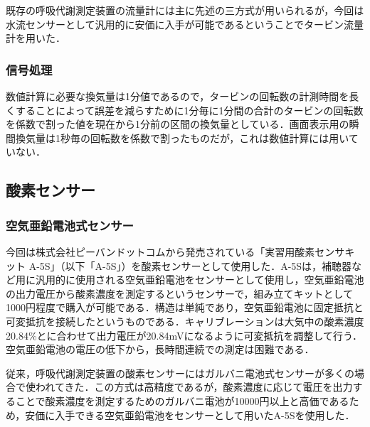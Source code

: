 

既存の呼吸代謝測定装置の流量計には主に先述の三方式が用いられるが，今回は水流センサーとして汎用的に安価に入手が可能であるということでタービン流量計を用いた．

\subsubsection{信号処理}

数値計算に必要な換気量は1分値であるので，タービンの回転数の計測時間を長くすることによって誤差を減らすために1分毎に1分間の合計のタービンの回転数を係数で割った値を現在から1分前の区間の換気量としている．画面表示用の瞬間換気量は1秒毎の回転数を係数で割ったものだが，これは数値計算には用いていない．

\subsection{酸素センサー}

\subsubsection{空気亜鉛電池式センサー}

今回は株式会社ピーバンドットコムから発売されている「実習用酸素センサキット A-5S」（以下「A-5S」）を酸素センサーとして使用した．A-5Sは，補聴器など用に汎用的に使用される空気亜鉛電池をセンサーとして使用し，空気亜鉛電池の出力電圧から酸素濃度を測定するというセンサーで，組み立てキットとして1000円程度で購入が可能である．構造は単純であり，空気亜鉛電池に固定抵抗と可変抵抗を接続したというものである．キャリブレーションは大気中の酸素濃度20.84\%とに合わせて出力電圧が20.84mVになるように可変抵抗を調整して行う．空気亜鉛電池の電圧の低下から，長時間連続での測定は困難である．

従来，呼吸代謝測定装置の酸素センサーにはガルバニ電池式センサーが多くの場合で使われてきた．この方式は高精度であるが，酸素濃度に応じて電圧を出力することで酸素濃度を測定するためのガルバニ電池が10000円以上と高価であるため，安価に入手できる空気亜鉛電池をセンサーとして用いたA-5Sを使用した．

